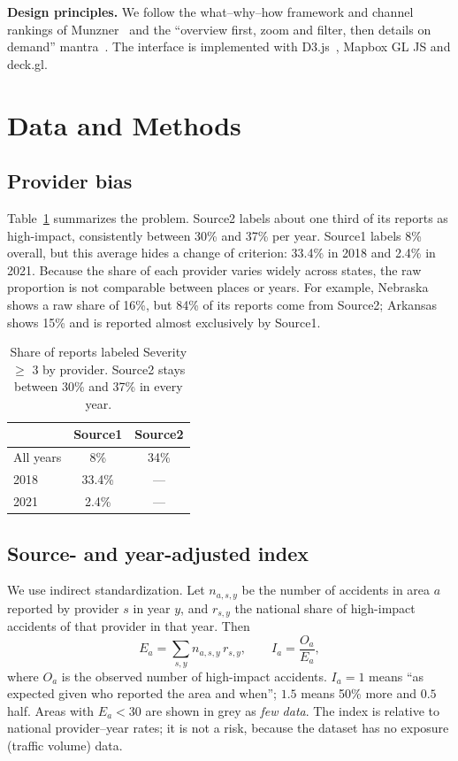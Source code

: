 \documentclass[conference]{IEEEtran}
\begin{document}
\textbf{Design principles.} We follow the what--why--how framework and channel rankings of Munzner~\cite{munzner2014visualization} and the ``overview first, zoom and filter, then details on demand'' mantra~\cite{shneiderman1996eyes}. The interface is implemented with D3.js~\cite{bostock2011d3}, Mapbox GL JS and deck.gl.

\section{Data and Methods}\label{sec:data}

\subsection{Provider bias}
Table~\ref{tab:bias} summarizes the problem. Source2 labels about one third of its reports as high-impact, consistently between 30\% and 37\% per year. Source1 labels 8\% overall, but this average hides a change of criterion: 33.4\% in 2018 and 2.4\% in 2021. Because the share of each provider varies widely across states, the raw proportion is not comparable between places or years. For example, Nebraska shows a raw share of 16\%, but 84\% of its reports come from Source2; Arkansas shows 15\% and is reported almost exclusively by Source1.

\begin{table}[t]
\centering
\caption{Share of reports labeled Severity $\geq$ 3 by provider. Source2 stays between 30\% and 37\% in every year.}
\label{tab:bias}
\begin{tabular}{lcc}
\toprule
 & Source1 & Source2 \\
\midrule
All years & 8\% & 34\% \\
2018 & 33.4\% & --- \\
2021 & 2.4\% & --- \\
\bottomrule
\end{tabular}
\end{table}

\subsection{Source- and year-adjusted index}
We use indirect standardization. Let $n_{a,s,y}$ be the number of accidents in area $a$ reported by provider $s$ in year $y$, and $r_{s,y}$ the national share of high-impact accidents of that provider in that year. Then
\begin{equation}
E_a=\sum_{s,y} n_{a,s,y}\, r_{s,y}, \qquad I_a=\frac{O_a}{E_a},
\end{equation}
where $O_a$ is the observed number of high-impact accidents. $I_a=1$ means ``as expected given who reported the area and when''; $1.5$ means 50\% more and $0.5$ half. Areas with $E_a<30$ are shown in grey as \emph{few data}. The index is relative to national provider--year rates; it is not a risk, because the dataset has no exposure (traffic volume) data.
\end{document}
